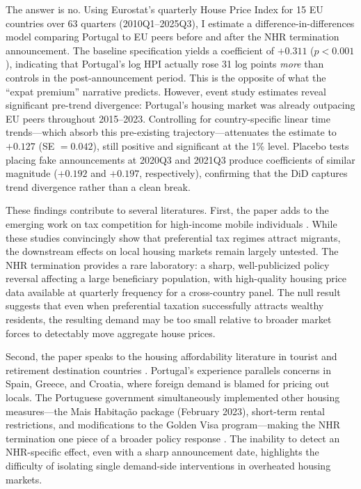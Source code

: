 \documentclass[12pt]{article}
\begin{document}
The answer is no. Using Eurostat's quarterly House Price Index for 15 EU countries over 63 quarters (2010Q1--2025Q3), I estimate a difference-in-differences model comparing Portugal to EU peers before and after the NHR termination announcement. The baseline specification yields a coefficient of $+0.311$ ($p < 0.001$), indicating that Portugal's log HPI actually rose 31 log points \emph{more} than controls in the post-announcement period. This is the opposite of what the ``expat premium'' narrative predicts. However, event study estimates reveal significant pre-trend divergence: Portugal's housing market was already outpacing EU peers throughout 2015--2023. Controlling for country-specific linear time trends---which absorb this pre-existing trajectory---attenuates the estimate to $+0.127$ (SE $= 0.042$), still positive and significant at the 1\% level. Placebo tests placing fake announcements at 2020Q3 and 2021Q3 produce coefficients of similar magnitude ($+0.192$ and $+0.197$, respectively), confirming that the DiD captures trend divergence rather than a clean break.

These findings contribute to several literatures. First, the paper adds to the emerging work on tax competition for high-income mobile individuals \citep{kleven2014migration, akcigit2016taxation, moretti2023taxing}. While these studies convincingly show that preferential tax regimes attract migrants, the downstream effects on local housing markets remain largely untested. The NHR termination provides a rare laboratory: a sharp, well-publicized policy reversal affecting a large beneficiary population, with high-quality housing price data available at quarterly frequency for a cross-country panel. The null result suggests that even when preferential taxation successfully attracts wealthy residents, the resulting demand may be too small relative to broader market forces to detectably move aggregate house prices.

Second, the paper speaks to the housing affordability literature in tourist and retirement destination countries \citep{saiz2010geographic, favilukis2017housing}. Portugal's experience parallels concerns in Spain, Greece, and Croatia, where foreign demand is blamed for pricing out locals. The Portuguese government simultaneously implemented other housing measures---the Mais Habita\c{c}\~{a}o package (February 2023), short-term rental restrictions, and modifications to the Golden Visa program---making the NHR termination one piece of a broader policy response \citep{maishabitacao2023}. The inability to detect an NHR-specific effect, even with a sharp announcement date, highlights the difficulty of isolating single demand-side interventions in overheated housing markets.
\end{document}
